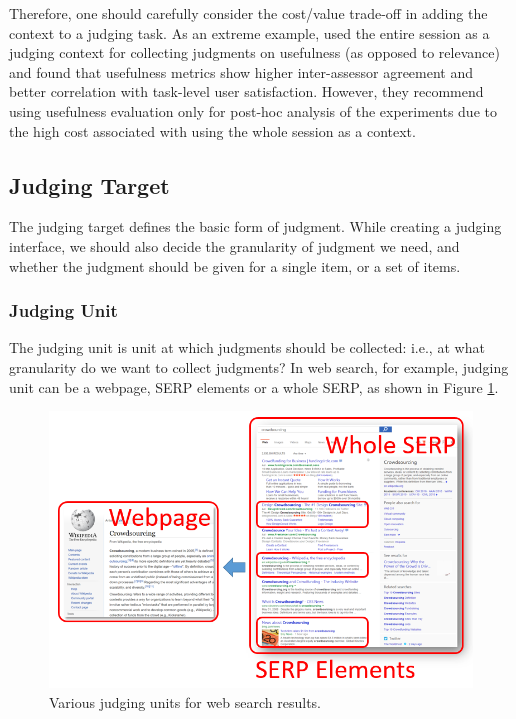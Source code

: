 Therefore, one should carefully consider the cost/value trade-off in adding the context to a judging task. As an extreme example, \cite{Mao:2016} used the entire session as a judging context for collecting judgments on usefulness (as opposed to relevance) and found that usefulness metrics show higher inter-assessor agreement and better correlation with task-level user satisfaction. However, they recommend using usefulness evaluation only for post-hoc analysis of the experiments due to the high cost associated with using the whole session as a context.

\subsection{Judging Target}
The judging target defines the basic form of judgment. While creating a judging interface, we should also decide the granularity of judgment we need, and whether the judgment should be given for a single item, or a set of items. 

\subsubsection{Judging Unit}
The judging unit is unit at which judgments should be collected: i.e., at what granularity do we want to collect judgments? In web search, for example, judging unit can be a webpage, SERP elements or a whole SERP, as shown in Figure \ref{fig:judging_units}. 

\begin{figure}
	\begin{center}
		\includegraphics[scale=0.5]{images/judging_units}
		\caption{Various judging units for web search results.} 
		\label{fig:judging_units}
	\end{center}
\end{figure}

